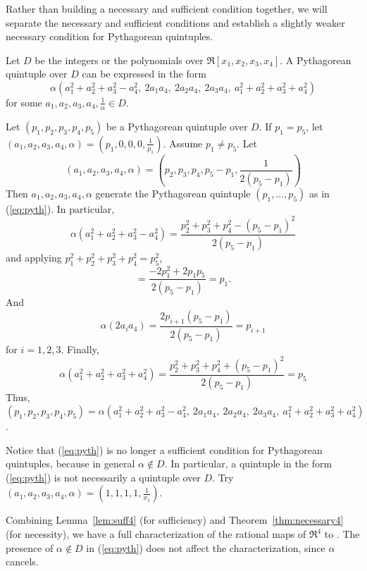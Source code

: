 Rather than building a necessary and sufficient condition together,
we will separate the necessary and sufficient conditions and
establish a slightly weaker necessary condition for Pythagorean quintuples.

\begin{theorem}
\label{thm:necessary4}
Let $D$ be the integers or the polynomials over $\Re[x_1,x_2,x_3,x_4]$.
A Pythagorean quintuple over $D$ can be expressed in the form
\begin{equation}
\label{eq:pyth}
	\alpha (a_1^2 + a_2^2 + a_3^2 - a_4^2,
		\ 2a_1a_4,\ 2a_2a_4,\ 2a_3a_4,
		\ a_1^2 + a_2^2 + a_3^2 + a_4^2)
\end{equation}
for some $a_1,a_2,a_3,a_4,\frac{1}{\alpha} \in D$.
\end{theorem}
\prf
Let $(p_1,p_2,p_3,p_4,p_5)$ be a Pythagorean quintuple over $D$.
If $p_1 = p_5$, let $(a_1,a_2,a_3,a_4,\alpha) = (p_1,0,0,0,\frac{1}{p_1})$.
Assume $p_1 \neq p_5$.
Let
\[
(a_1,a_2,a_3,a_4,\alpha) = (p_2,p_3,p_4,p_5-p_1,\frac{1}{2(p_5 - p_1)})
\]
Then $a_1,a_2,a_3,a_4,\alpha$ generate the Pythagorean quintuple
$(p_1,\ldots,p_5)$ as in (\ref{eq:pyth}).
In particular,
\[
\alpha (a_1^2 + a_2^2 + a_3^2 - a_4^2)
= \frac{p_2^2 + p_3^2 + p_4^2 - (p_5 - p_1)^2}{2(p_5-p_1)}
\]
and applying $p_1^2 + p_2^2 + p_3^2 + p_4^2 = p_5^2$,
\[
= \frac{-2p_1^2 + 2p_1p_5}{2(p_5 - p_1)} = p_1.
\]
And
\[
\alpha (2a_i a_4) = \frac{2p_{i+1}(p_5 - p_1)}{2(p_5 - p_1)} = p_{i+1}
\]
for $i=1,2,3$.
Finally, 
\[
\alpha(a_1^2 + a_2^2 + a_3^2 + a_4^2) 
= \frac{p_2^2 + p_3^2 + p_4^2 + (p_5 - p_1)^2}{2(p_5-p_1)} = p_5
\]
Thus, $(p_1,p_2,p_3,p_4,p_5) = \alpha (a_1^2 + a_2^2 + a_3^2 - a_4^2,
		\ 2a_1a_4,\ 2a_2a_4,\ 2a_3a_4,
		\ a_1^2 + a_2^2 + a_3^2 + a_4^2)$.
\QED

Notice that (\ref{eq:pyth}) is no longer a sufficient condition for
Pythagorean quintuples, because in general $\alpha \not\in D$.
In particular, a quintuple in the form (\ref{eq:pyth}) is not necessarily
a quintuple over $D$.
Try $(a_1,a_2,a_3,a_4,\alpha) = (1,1,1,1,\frac{1}{x_1})$.
	
Combining Lemma~\ref{lem:suff4} (for sufficiency) 
and Theorem~\ref{thm:necessary4} (for necessity),
we have a full characterization
of the rational maps of $\Re^4$ to .
The presence of $\alpha \not\in D$ in (\ref{eq:pyth}) does not 
affect the characterization, since $\alpha$ cancels.

